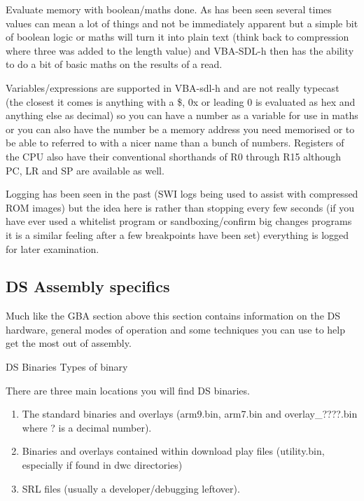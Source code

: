 \documentclass[
]{book}
\providecommand{\tightlist}{%
  \setlength{\itemsep}{0pt}\setlength{\parskip}{0pt}}
\begin{document}
Evaluate memory with boolean/maths done. As has been seen several times values can mean a lot of things and not be immediately apparent but a simple bit of boolean logic or maths will turn it into plain text (think back to compression where three was added to the length value) and VBA-SDL-h then has the ability to do a bit of basic maths on the results of a read.

Variables/expressions are supported in VBA-sdl-h and are not really typecast (the closest it comes is anything with a \$, 0x or leading 0 is evaluated as hex and anything else as decimal) so you can have a number as a variable for use in maths or you can also have the number be a memory address you need memorised or to be able to referred to with a nicer name than a bunch of numbers. Registers of the CPU also have their conventional shorthands of R0 through R15 although PC, LR and SP are available as well.

Logging has been seen in the past (SWI logs being used to assist with compressed ROM images) but the idea here is rather than stopping every few seconds (if you have ever used a whitelist program or sandboxing/confirm big changes programs it is a similar feeling after a few breakpoints have been set) everything is logged for later examination.

\hypertarget{ds-assembly-specifics}{%
\subsection{DS Assembly specifics}\label{ds-assembly-specifics}}

Much like the GBA section above this section contains information on the DS hardware, general modes of operation and some techniques you can use to help get the most out of assembly.

DS Binaries Types of binary

There are three main locations you will find DS binaries.

\begin{enumerate}
\def\labelenumi{\arabic{enumi}.}
\tightlist
\item
  The standard binaries and overlays (arm9.bin, arm7.bin and overlay\_????.bin where ? is a decimal number).
\item
  Binaries and overlays contained within download play files (utility.bin, especially if found in dwc directories)
\item
  SRL files (usually a developer/debugging leftover).
\end{enumerate}
\end{document}
